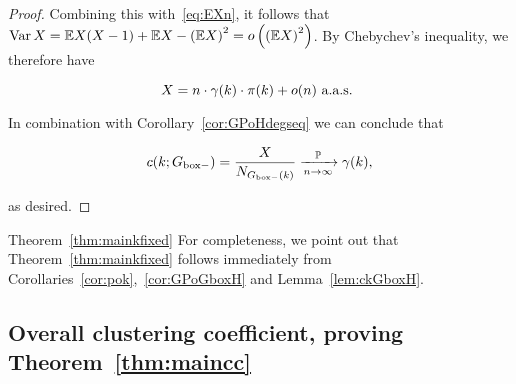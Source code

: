 \begin{proof}
\noindent
Combining this with~\eqref{eq:EXn}, it follows that 
$\operatorname{Var} X = {\mathbb E} X(X-1) + {\mathbb E} X - \left({\mathbb E} X\right)^2 = o\left( \left({\mathbb E} X\right)^2 \right)$.
 By Chebychev's inequality, we therefore have 
 
 $$ X = n \cdot \gamma(k) \cdot {\pi}(k) + o(n) \text{ a.a.s. } $$
 
In combination with Corollary~\ref{cor:GPoHdegseq} we can conclude that

$$ c(k;G_{\mathrm{box}-}) = \frac{X}{N_{G_{\mathrm{box}-}(k)}} \xrightarrow[n\to\infty]{\mathbb{P}} \gamma(k), $$

\noindent
as desired.
 \end{proof}

 
 
 
\begin{proofof}{Theorem~\ref{thm:mainkfixed}}
For completeness, we point out that Theorem~\ref{thm:mainkfixed} follows immediately from 
Corollaries~\ref{cor:pok},~\ref{cor:GPoGboxH} and Lemma~\ref{lem:ckGboxH}.
\end{proofof}




\subsection{Overall clustering coefficient, proving Theorem~\ref{thm:maincc}}

% 
% 
% 


